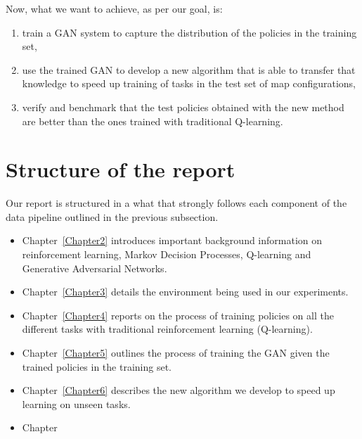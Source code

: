 Now, what we want to achieve, as per our goal, is:
\begin{enumerate}
	\item train a GAN system to capture the distribution of the policies in the training set,
	\item use the trained GAN to develop a new algorithm that is able to transfer that knowledge to speed up training of tasks in the test set of map configurations,
	\item verify and benchmark that the test policies obtained with the new method are better than the ones trained with traditional Q-learning.
\end{enumerate}


\section{Structure of the report}
Our report is structured in a what that strongly follows each component of the data pipeline outlined in the previous subsection.
\begin{itemize}
	\item Chapter~\ref{Chapter2} introduces important background information on reinforcement learning, Markov Decision Processes, Q-learning and Generative Adversarial Networks.
	\item Chapter~\ref{Chapter3} details the environment being used in our experiments.
	\item Chapter~\ref{Chapter4} reports on the process of training policies on all the different tasks with traditional reinforcement learning (Q-learning).
	\item Chapter~\ref{Chapter5} outlines the process of training the GAN given the trained policies in the training set.
	\item Chapter~\ref{Chapter6} describes the new algorithm we develop to speed up learning on unseen tasks.
	\item Chapter
\end{itemize}

